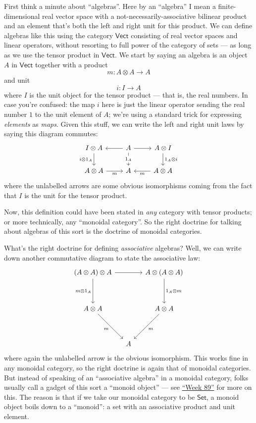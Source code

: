 \documentclass{article}
\begin{document}
First think a minute about ``algebras''. Here by an ``algebra'' I mean a
finite-dimensional real vector space with a not-necessarily-associative
bilinear product and an element that's both the left and right unit for
this product. We can define algebras like this using the category
\(\mathsf{Vect}\) consisting of real vector spaces and linear operators,
without resorting to full power of the category of sets --- as long as
we use the tensor product in \(\mathsf{Vect}\). We start by saying an
algebra is an object \(A\) in \(\mathsf{Vect}\) together with a product
\[m\colon A \otimes A \to A\] and unit \[i\colon I \to A\] where \(I\)
is the unit object for the tensor product --- that is, the real numbers.
In case you're confused: the map \(i\) here is just the linear operator
sending the real number \(1\) to the unit element of \(A\); we're using
a standard trick for expressing \emph{elements} as \emph{maps}. Given
this stuff, we can write the left and right unit laws by saying this
diagram commutes: \[
  \begin{tikzcd}
    I\otimes A
      \dar[swap,"i\otimes1_A"]
    & A
      \lar \rar
      \dar["1_A" description]
    & A\otimes I
      \dar["1_A\otimes i"]
  \\A\otimes A
      \rar[swap,"m"]
    & A
    & A\otimes A
      \lar["m"]
  \end{tikzcd}
\] where the unlabelled arrows are some obvious isomorphisms coming from
the fact that \(I\) is the unit for the tensor product.

Now, this definition could have been stated in \emph{any} category with
tensor products; or more technically, any ``monoidal category''. So the
right doctrine for talking about algebras of this sort is the doctrine
of monoidal categories.

What's the right doctrine for defining \emph{associative} algebras?
Well, we can write down another commutative diagram to state the
associative law: \[
  \begin{tikzcd}[column sep=small,row sep=huge]
    (A\otimes A)\otimes A
      \ar[rr]
      \dar[swap,"m\otimes1_A"]
    && A\otimes(A\otimes A)
      \dar["1_A\otimes m"]
  \\A\otimes A
      \drar[swap,"m"]
    && A\otimes A
      \dlar["m"]
  \\&A&
  \end{tikzcd}
\] where again the unlabelled arrow is the obvious isomorphism. This
works fine in any monoidal category, so the right doctrine is again that
of monoidal categories. But instead of speaking of an ``associative
algebra'' in a monoidal category, folks usually call a gadget of this
sort a ``monoid object'' --- see \protect\hyperlink{week89}{``Week 89''}
for more on this. The reason is that if we take our monoidal category to
be \(\mathsf{Set}\), a monoid object boils down to a ``monoid'': a set
with an associative product and unit element.
\end{document}
